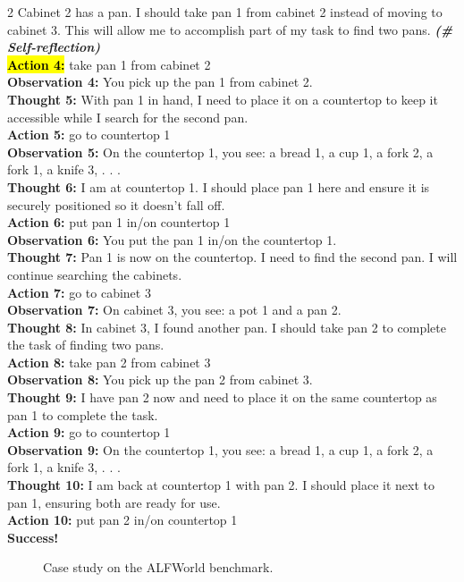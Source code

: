 \begin{tcolorbox}[breakable,title=Case Study on the ALFWorld Benchmark]
\begin{multicols}{2}
 Cabinet 2 has a pan. I should take pan 1 from cabinet 2 instead of moving to cabinet 3. This will allow me to accomplish part of my task to find two pans. \textcolor{my_green}{\textit{\textbf{(\# Self-reflection)}}}\\
\textbf{\hl{Action 4:}} take pan 1 from cabinet 2\quad \\
\textcolor{case_purple}{\textbf{Observation 4:}} You pick up the pan 1 from cabinet 2.\\
\textcolor{case_blue}{\textbf{Thought 5:}} With pan 1 in hand, I need to place it on a countertop to keep it accessible while I search for the second pan.\\
\textcolor{case_blue}{\textbf{Action 5:}} go to countertop 1\\
\textcolor{case_purple}{\textbf{Observation 5:}} On the countertop 1, you see: a bread 1, a cup 1, a fork 2, a fork 1, a knife 3, . . .\\
\textcolor{case_blue}{\textbf{Thought 6:}} I am at countertop 1. I should place pan 1 here and ensure it is securely positioned so it doesn't fall off.\\
\textcolor{case_blue}{\textbf{Action 6:}} put pan 1 in/on countertop 1\quad \\
\textcolor{case_purple}{\textbf{Observation 6:}} You put the pan 1 in/on the countertop 1.\\
\textcolor{case_blue}{\textbf{Thought 7:}} Pan 1 is now on the countertop. I need to find the second pan. I will continue searching the cabinets.\\
\textcolor{case_blue}{\textbf{Action 7:}} go to cabinet 3\\
\textcolor{case_purple}{\textbf{Observation 7:}} On cabinet 3, you see: a pot 1 and a pan 2.\\
\textcolor{case_blue}{\textbf{Thought 8:}} In cabinet 3, I found another pan. I should take pan 2 to complete the task of finding two pans.\\
\textcolor{case_blue}{\textbf{Action 8:}} take pan 2 from cabinet 3\quad \\
\textcolor{case_purple}{\textbf{Observation 8:}} You pick up the pan 2 from cabinet 3.\\
\textcolor{case_blue}{\textbf{Thought 9:}} I have pan 2 now and need to place it on the same countertop as pan 1 to complete the task.\\
\textcolor{case_blue}{\textbf{Action 9:}} go to countertop 1\\
\textcolor{case_purple}{\textbf{Observation 9:}} On the countertop 1, you see: a bread 1, a cup 1, a fork 2, a fork 1, a knife 3, . . .\\
\textcolor{case_blue}{\textbf{Thought 10:}} I am back at countertop 1 with pan 2. I should place it next to pan 1, ensuring both are ready for use.\\
\textcolor{case_blue}{\textbf{Action 10:}} put pan 2 in/on countertop 1\quad \\
\textcolor{my_green}{\textbf{Success!}}
\end{multicols}
\end{tcolorbox}
\begin{figure}[ht]
    \centering
    \vspace{-8pt}
    \caption{
    Case study on the ALFWorld benchmark.
    }
    \label{fig:alfworld_case}
\end{figure}